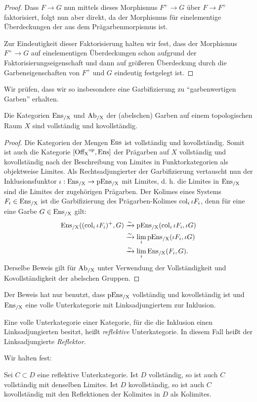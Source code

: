 \begin{proof}
  Dass $F \to G$ nun mittels dieses Morphismus $F^+ \to G$ über $F \to
  F^+$ faktorisiert, folgt nun aber direkt, da der Morphismus für
  einelementige Überdeckungen der aus dem Prägarbenmorpismus ist.

  Zur Eindeutigkeit dieser Faktorisierung halten wir fest, dass der
  Morphismus $F^+ \to G$ auf einelementigen Überdeckungen schon
  aufgrund der Faktorisierungseigenschaft und dann auf größeren
  Überdeckung durch die Garbeneigenschaften von $F^+$ und $G$
  eindeutig festgelegt ist.
\end{proof}

Wir prüfen, dass wir so insbesondere eine Garbifizierung zu
``garbenwertigen Garben'' erhalten.
\begin{lemma} \label{ensx-complete}
  Die Kategorien $\operatorname{Ens_{/X}}$ und $\operatorname{Ab_{/X}}$ der (abelschen) Garben auf einem
  topologischen Raum $X$ sind vollständig und kovollständig.
\end{lemma}
\begin{proof}
  Die Kategorien der Mengen $\operatorname{Ens}$ ist vollständig und
  kovollständig. Somit ist auch die Kategorie $[\operatorname{Off_X}^\mathrm{op}, \operatorname{Ens}]$ der
  Prägarben auf $X$ vollständig und kovollständig nach der
  Beschreibung von Limites in Funktorkategorien als objektweise
  Limites. Als Rechtsadjungierter der Garbifizierung vertauscht nun
  der Inklusionsfunktor $\iota: \operatorname{Ens_{/X}} \to \operatorname{pEns_{/X}}$ mit Limites,
  d. h. die Limites in $\operatorname{Ens_{/X}}$ sind die Limites der zugehörigen
  Prägarben. Der Kolimes eines Systems $F_i \in \operatorname{Ens_{/X}}$ ist die
  Garbifizierung des Prägarben-Kolimes $\operatorname{col}_i \iota F_i$, denn für
  eine eine Garbe $G \in \operatorname{Ens_{/X}}$ gilt:
  \begin{align*}
    \operatorname{Ens_{/X}}((\operatorname{col}_i \iota F_i)^+, G)
    &\xrightarrow[]{\sim} \operatorname{pEns_{/X}}(\operatorname{col}_i \iota F_i, \iota G) \\
    &\xrightarrow[]{\sim} \lim_i \operatorname{pEns_{/X}}(\iota F_i, \iota G) \\
    &\xrightarrow[]{\sim} \lim_i \operatorname{Ens_{/X}}(F_i, G).
  \end{align*}
  Derselbe Beweis gilt für $\operatorname{Ab_{/X}}$ unter Verwendung der Vollständigkeit
  und Kovollständigkeit der abelschen Gruppen.
\end{proof}
Der Beweis hat nur benutzt, dass $\operatorname{pEns_{/X}}$ vollständig und
kovollständig ist und $\operatorname{Ens_{/X}}$ eine volle Unterkategorie mit
Linksadjungiertem zur Inklusion.
\begin{defn} \label{def:refl-sub}
  Eine volle Unterkategorie einer Kategorie, für die die Inklusion
  einen Linksadjungierten besitzt, heißt \emph{reflektive}
  Unterkategorie. In diesem Fall heißt der Linksadjungierte
  \emph{Reflektor}.
\end{defn}
Wir halten fest:
\begin{prop} \label{refl-sub-complete}
  Sei $C \subset D$ eine reflektive Unterkategorie. Ist $D$
  vollständig, so ist auch $C$ vollständig mit denselben Limites. Ist
  $D$ kovollständig, so ist auch $C$ kovollständig mit den
  Reflektionen der Kolimites in $D$ als Kolimites.
\end{prop}

